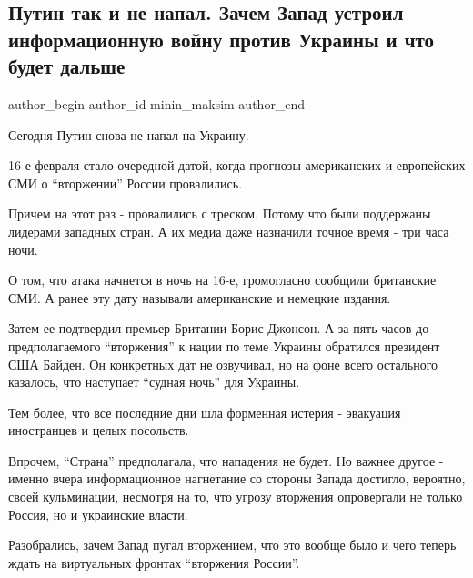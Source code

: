  
 
 
 
 
 
\subsection{Путин так и не напал. Зачем Запад устроил информационную войну против Украины и что будет дальше}
\label{sec:16_02_2022.stz.news.ua.strana.3.putin_ne_napal_infvojna}
 
\ifcmt
 author_begin
   author_id minin_maksim
 author_end
\fi

Сегодня Путин снова не напал на Украину. 

16-е февраля стало очередной датой, когда прогнозы американских и европейских
СМИ о \enquote{вторжении} России провалились.


Причем на этот раз - провалились с треском. Потому что были поддержаны лидерами
западных стран. А их медиа даже назначили точное время - три часа ночи.

О том, что атака начнется в ночь на 16-е, громогласно сообщили британские СМИ.
А ранее эту дату называли американские и немецкие издания. 

Затем ее подтвердил премьер Британии Борис Джонсон. А за пять часов до
предполагаемого \enquote{вторжения} к нации по теме Украины обратился президент США
Байден. Он конкретных дат не озвучивал, но на фоне всего остального казалось,
что наступает \enquote{судная ночь} для Украины. 

Тем более, что все последние дни шла форменная истерия - эвакуация иностранцев
и целых посольств. 

Впрочем, \enquote{Страна} предполагала, что нападения не будет. Но важнее другое -
именно вчера информационное нагнетание со стороны Запада достигло, вероятно,
своей кульминации, несмотря на то, что угрозу вторжения опровергали не только
Россия, но и украинские власти. 

Разобрались, зачем Запад пугал вторжением, что это вообще было и чего теперь
ждать на виртуальных фронтах \enquote{вторжения России}.



